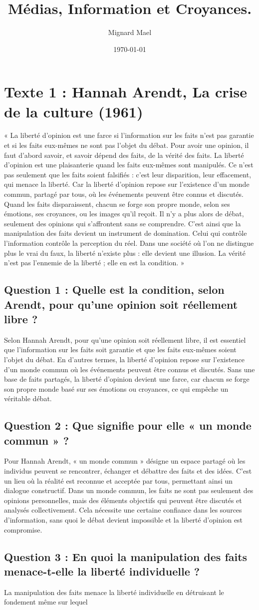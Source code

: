 \documentclass[a4paper,12pt]{article}
\title{Médias, Information et Croyances.}
\author{Mignard Mael}
\date{\today}
\begin{document}
\maketitle

\section{Texte 1 : Hannah Arendt, La crise de la culture (1961)}
« La liberté d’opinion est une farce si l’information sur les faits n’est pas garantie et si
les faits eux-mêmes ne sont pas l’objet du débat.
Pour avoir une opinion, il faut d’abord savoir, et savoir dépend des faits, de la vérité des
faits.
La liberté d’opinion est une plaisanterie quand les faits eux-mêmes sont manipulés. Ce
n’est pas seulement que les faits soient falsifiés : c’est leur disparition, leur
effacement, qui menace la liberté. Car la liberté d’opinion repose sur l’existence d’un
monde commun, partagé par tous, où les événements peuvent être connus et discutés.
Quand les faits disparaissent, chacun se forge son propre monde, selon ses émotions,
ses croyances, ou les images qu’il reçoit. Il n’y a plus alors de débat, seulement des
opinions qui s’affrontent sans se comprendre.
C’est ainsi que la manipulation des faits devient un instrument de domination. Celui qui
contrôle l’information contrôle la perception du réel.
Dans une société où l’on ne distingue plus le vrai du faux, la liberté n’existe plus : elle
devient une illusion. La vérité n’est pas l’ennemie de la liberté ; elle en est la condition. »

\subsection{Question 1 : Quelle est la condition, selon Arendt, pour qu’une opinion soit réellement libre ?}
Selon Hannah Arendt, pour qu’une opinion soit réellement libre, il est essentiel que l’information sur les faits soit garantie et que les faits eux-mêmes soient l’objet du débat. En d'autres termes, la liberté d’opinion repose sur l’existence d’un monde commun où les événements peuvent être connus et discutés. Sans une base de faits partagés, la liberté d’opinion devient une farce, car chacun se forge son propre monde basé sur ses émotions ou croyances, ce qui empêche un véritable débat.
\subsection{Question 2 : Que signifie pour elle « un monde commun » ?} 
Pour Hannah Arendt, « un monde commun » désigne un espace partagé où les individus peuvent se rencontrer, échanger et débattre des faits et des idées. C'est un lieu où la réalité est reconnue et acceptée par tous, permettant ainsi un dialogue constructif. Dans un monde commun, les faits ne sont pas seulement des opinions personnelles, mais des éléments objectifs qui peuvent être discutés et analysés collectivement. Cela nécessite une certaine confiance dans les sources d'information, sans quoi le débat devient impossible et la liberté d'opinion est compromise.
\subsection{Question 3 : En quoi la manipulation des faits menace-t-elle la liberté individuelle ?}
La manipulation des faits menace la liberté individuelle en détruisant le fondement même sur lequel 
\end{document}
